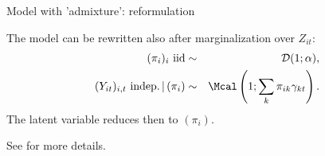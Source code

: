 \documentclass[compress,10pt]{beamer}
\begin{document}
 
\begin{frame}{Model with  'admixture': reformulation}

The model can be rewritten also after marginalization over $Z_{it}$:
\begin{eqnarray*}
 (\pi_i)_i \text{ iid} & \sim & \mathcal{D}(1; \alpha), \\
 (Y_{it})_{i, t} \text{ indep.} \,|\, (\pi_i) & \sim & \Mcal\left(1;\sum_k \pi_{ik} \gamma_{kt}\right).
\end{eqnarray*} 
The latent variable reduces then to $(\pi_i)$.


See \cite{Pritchard2000} for more details. 
\end{frame}

\end{document}
